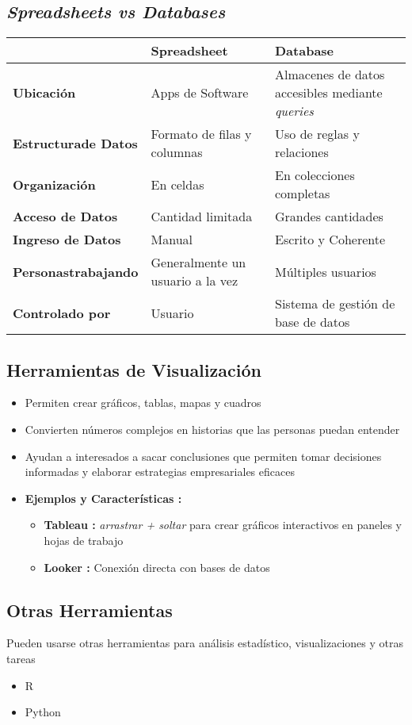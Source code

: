 \subsection{\textit{Spreadsheets vs Databases}}
\begin{table}
    \centering
    \begin{tabular}{|p{3.5cm}|p{5.5cm}|p{5.5cm}|}
        \hline
        & \textbf{Spreadsheet} & \textbf{Database} \\
        \hline
        \textbf{Ubicación} & Apps de Software & Almacenes de datos accesibles mediante \textit{queries} \\
        \hline
        \textbf{Estructura\break de Datos} & Formato de filas y columnas & Uso de reglas y relaciones \\
        \hline
        \textbf{Organización} & En celdas & En colecciones completas \\
        \hline
        \textbf{Acceso de Datos} & Cantidad limitada & Grandes cantidades \\
        \hline
        \textbf{Ingreso de Datos} & Manual & Escrito y Coherente \\
        \hline
        \textbf{Personas\break trabajando} & Generalmente un usuario a la vez & Múltiples usuarios \\
        \hline
        \textbf{Controlado por} & Usuario & Sistema de gestión de base de datos \\
        \hline
    \end{tabular}
\end{table}

\subsection{Herramientas de Visualización}
\begin{itemize}
    \item {Permiten crear gráficos, tablas, mapas y cuadros}
    \item {Convierten números complejos en historias que las personas puedan entender}
    \item {Ayudan a interesados a sacar conclusiones que permiten tomar decisiones informadas y elaborar estrategias empresariales eficaces}
    \item {\textbf{Ejemplos y Características : }
    \begin{itemize}
        \item {\textbf{Tableau : }\textit{arrastrar + soltar} para crear gráficos interactivos en paneles y hojas de trabajo}
        \item {\textbf{Looker : }Conexión directa con bases de datos}
    \end{itemize}}
\end{itemize}

\subsection{Otras Herramientas}
Pueden usarse otras herramientas para análisis estadístico, visualizaciones y otras tareas
\begin{itemize}
    \item {R}
    \item {Python}
\end{itemize}

\newpage